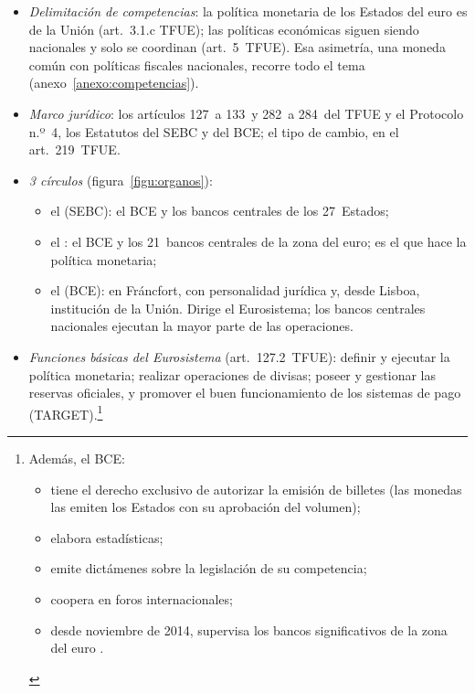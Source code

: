 \documentclass[11pt]{article}
\begin{document}
\begin{itemize}
\item \emph{Delimitación de competencias}: la política monetaria de los Estados del euro es  de la Unión (art.~3.1.c TFUE); las políticas económicas siguen siendo nacionales y solo se coordinan (art.~5~TFUE). Esa asimetría, una moneda común con políticas fiscales nacionales, recorre todo el tema (anexo~\ref{anexo:competencias}).
\item \emph{Marco jurídico}: los artículos 127~a 133~y 282~a 284~del TFUE y el Protocolo n.º~4, los Estatutos del SEBC y del BCE\nocite{TFUE2016,UE2016Protocolo4}; el tipo de cambio, en el art.~219~TFUE.
\item \emph{3 círculos} (figura~\ref{figu:organos}):
  \begin{itemize}
  \item el  (SEBC): el BCE y los bancos centrales de los 27~Estados;
  \item el : el BCE y los 21~bancos centrales de la zona del euro; es el que hace la política monetaria;
  \item el  (BCE): en Fráncfort, con personalidad jurídica y, desde Lisboa, institución de la Unión. Dirige el Eurosistema; los bancos centrales nacionales ejecutan la mayor parte de las operaciones.
  \end{itemize}
\item \emph{Funciones básicas del Eurosistema} (art.~127.2~TFUE): definir y ejecutar la política monetaria; realizar operaciones de divisas; poseer y gestionar las reservas oficiales, y promover el buen funcionamiento de los sistemas de pago (TARGET).\footnote{Además, el BCE:
\begin{itemize}
\item tiene el derecho exclusivo de autorizar la emisión de billetes (las monedas las emiten los Estados con su aprobación del volumen);
\item elabora estadísticas;
\item emite dictámenes sobre la legislación de su competencia;
\item coopera en foros internacionales;
\item desde noviembre de 2014, supervisa los bancos significativos de la zona del euro .
\end{itemize}}
\end{itemize}
\end{document}
